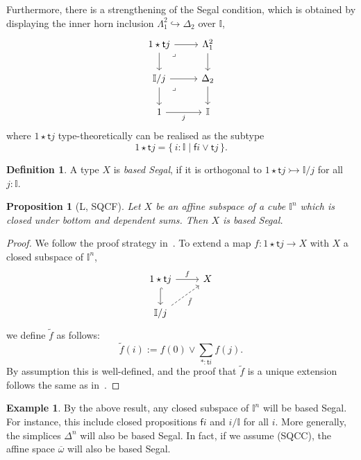 \documentclass[12pt]{amsart}
\newtheorem{proposition}[theorem]{Proposition}
\theoremstyle{definition}
\newtheorem{example}[theorem]{Example}
\newtheorem{definition}[theorem]{Definition}
\newcommand{\mbb}[1]{\mathbb{#1}}
\newcommand{\I}{\mbb I}
\newcommand{\ms}[1]{\mathsf{#1}}
\newcommand{\qsi}[1]{\tilde{#1}}
\newcommand{\ov}[1]{\overline{#1}}
\newcommand{\scomp}[2]{\{\,#1\mid#2\,\}}
\newcommand{\inj}{\rightarrowtail}
\newcommand{\hook}{\hookrightarrow}
\begin{document}
Furthermore, there is a strengthening of the Segal condition, which is obtained by displaying the inner horn inclusion $\Lambda^2_1 \hook \Delta_2$ over $\I$,
\[
\begin{tikzcd}
  1 \star \ms tj \ar[r] \ar[d] & \Lambda^2_1 \ar[d] \\ 
  \I/j \ar[r] \ar[d] & \Delta_2 \ar[d] \\ 
  1 \ar[r, "j"'] & \I 
  \arrow["\lrcorner"{anchor=center, pos=0.125}, draw=none, from=1-1, to=2-2]
  \arrow["\lrcorner"{anchor=center, pos=0.125}, draw=none, from=2-1, to=3-2]
\end{tikzcd}
\]
where $1 \star \ms tj$ type-theoretically can be realised as the subtype
\[ 1 \star \ms tj = \scomp{i : \I}{\ms fi \vee \ms tj}. \]

\begin{definition}
  A type $X$ is \emph{based Segal}, if it is orthogonal to $1 \star \ms tj \inj \I/j$ for all $j : \I$.
\end{definition}

\begin{proposition}[L, SQCF]
  Let $X$ be an affine subspace of a cube $\I^n$ which is closed under bottom and dependent sums. Then $X$ is based Segal.
\end{proposition}
\begin{proof}
  We follow the proof strategy in~\cite{}. To extend a map $f : 1 \star \ms tj \to X$ with $X$ a closed subspace of $\I^n$,
  \[
  \begin{tikzcd}
    1 \star \ms tj \ar[d, hook] \ar[r, "f"] & X \\ 
    \I/j \ar[ur, dashed, "\qsi f"']
  \end{tikzcd}
  \]
  we define $\qsi f$ as follows:
  \[ \qsi f(i) := f(0) \vee \sum_{*:\ms ti}f(j). \]
  By assumption this is well-defined, and the proof that $\qsi f$ is a unique extension follows the same as in~\cite{}.
\end{proof}

\begin{example}
  By the above result, any closed subspace of $\I^n$ will be based Segal. For instance, this include closed propositions $\ms fi$ and $i/\I$ for all $i$. More generally, the simplices $\Delta^n$ will also be based Segal. In fact, if we assume (SQCC), the affine space $\ov\omega$ will also be based Segal.
\end{example}

 

\end{document}
